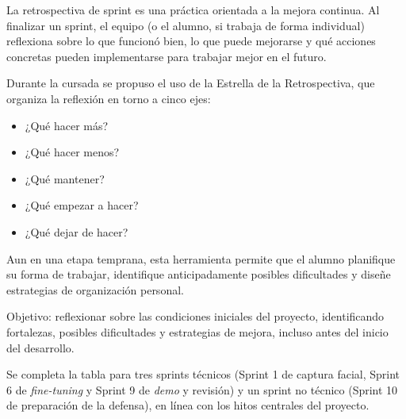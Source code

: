\documentclass[
  11pt, %
]{charter}
\begin{document}
La retrospectiva de sprint es una práctica orientada a la mejora continua. Al finalizar un sprint, el equipo (o el alumno, si trabaja de forma individual) reflexiona sobre lo que funcionó bien, lo que puede mejorarse y qué acciones concretas pueden implementarse para trabajar mejor en el futuro.

Durante la cursada se propuso el uso de la Estrella de la Retrospectiva, que organiza la reflexión en torno a cinco ejes:

\begin{itemize}
\item ¿Qué hacer más?
\item ¿Qué hacer menos?
\item ¿Qué mantener?
\item ¿Qué empezar a hacer?
\item ¿Qué dejar de hacer?
\end{itemize}

Aun en una etapa temprana, esta herramienta permite que el alumno planifique su forma de trabajar, identifique anticipadamente posibles dificultades y diseñe estrategias de organización personal.

Objetivo: reflexionar sobre las condiciones iniciales del proyecto, identificando fortalezas, posibles dificultades y estrategias de mejora, incluso antes del inicio del desarrollo.

Se completa la tabla para tres sprints técnicos (Sprint 1 de captura facial, Sprint 6 de \textit{fine-tuning} y Sprint 9 de \textit{demo} y revisión) y un sprint no técnico (Sprint 10 de preparación de la defensa), en línea con los hitos centrales del proyecto.
\end{document}
